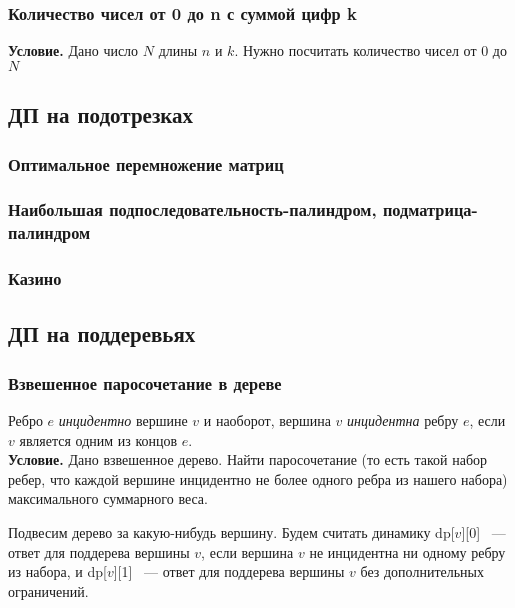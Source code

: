 \documentclass[a4paper,12pt]{article}
\begin{document}
      \subsubsection{Количество чисел от 0 до n с суммой цифр k}
      \textbf{Условие.} Дано число $N$ длины $n$ и $k$. Нужно посчитать 
      количество чисел от $0$ до $N$ 
    
    \subsection{ДП на подотрезках}

      \subsubsection{Оптимальное перемножение матриц}

      \subsubsection{Наибольшая подпоследовательность-палиндром, подматрица-палиндром}
      \subsubsection{Казино}

    \subsection{ДП на поддеревьях}

      \subsubsection{Взвешенное паросочетание в дереве}
      Ребро $e$ \emph{инцидентно} вершине $v$ и наоборот, вершина $v$ 
      \emph{инцидентна} ребру $e$, если $v$ является одним из концов $e$.
      \\
      
      \textbf{Условие.} Дано взвешенное дерево. Найти паросочетание (то есть 
      такой набор ребер, что каждой вершине инцидентно не более одного ребра из
      нашего набора) максимального суммарного веса.
      
      Подвесим дерево за какую-нибудь вершину. Будем считать динамику dp[$v$][0] 
      ~--- ответ для поддерева вершины $v$, если вершина $v$ не инцидентна ни 
      одному ребру из набора, и dp[$v$][1] ~--- ответ для поддерева вершины $v$
      без дополнительных ограничений.
      
\end{document}
